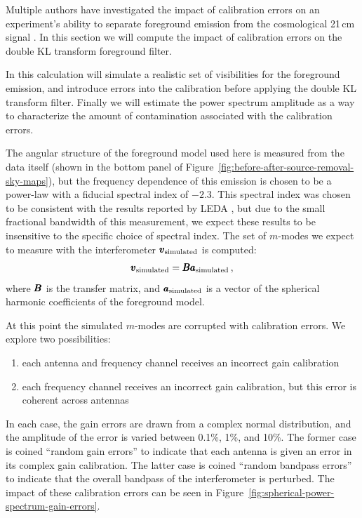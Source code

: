 \begin{bibunit}
Multiple authors have investigated the impact of calibration errors on an experiment's ability to
separate foreground emission from the cosmological 21\,cm signal \citep{2016MNRAS.461.3135B,
2017MNRAS.470.1849E}. In this section we will compute the impact of calibration errors on the double
KL transform foreground filter.

In this calculation will simulate a realistic set of visibilities for the foreground emission, and
introduce errors into the calibration before applying the double KL transform filter. Finally we
will estimate the power spectrum amplitude as a way to characterize the amount of contamination
associated with the calibration errors.

The angular structure of the foreground model used here is measured from the data itself (shown in
the bottom panel of Figure~\ref{fig:before-after-source-removal-sky-maps}), but the frequency
dependence of this emission is chosen to be a power-law with a fiducial spectral index of $-2.3$.
This spectral index was chosen to be consistent with the results reported by LEDA
\citep{2018MNRAS.478.4193P}, but due to the small fractional bandwidth of this measurement, we
expect these results to be insensitive to the specific choice of spectral index. The set of
$m$-modes we expect to measure with the interferometer $\pmb v_\text{simulated}$ is computed:
\begin{equation}
    \pmb v_\text{simulated} = \pmb B\pmb a_\text{simulated}\,,
\end{equation}
where $\pmb B$ is the transfer matrix, and $\pmb a_\text{simulated}$ is a vector of the spherical
harmonic coefficients of the foreground model.

At this point the simulated $m$-modes are corrupted with calibration errors. We explore two
possibilities:
\begin{enumerate}
    \item each antenna and frequency channel receives an incorrect gain calibration
    \item each frequency channel receives an incorrect gain calibration, but this error is coherent
        across antennas
\end{enumerate}
In each case, the gain errors are drawn from a complex normal distribution, and the amplitude of the
error is varied between 0.1\%, 1\%, and 10\%. The former case is coined ``random gain errors'' to
indicate that each antenna is given an error in its complex gain calibration. The latter case is
coined ``random bandpass errors'' to indicate that the overall bandpass of the interferometer is
perturbed. The impact of these calibration errors can be seen in
Figure~\ref{fig:spherical-power-spectrum-gain-errors}.


\end{bibunit}
